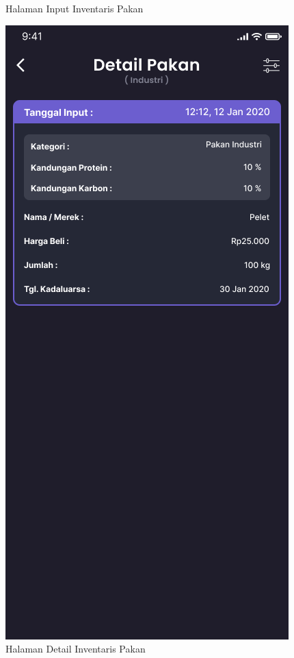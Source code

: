 \begin{enumerate}
\begin{enumerate}
\begin{figure}[H]
			  \caption{Halaman Input Inventaris Pakan}
			\endminipage\hfill
			  \includegraphics[width=\linewidth]{gambar/sprint1/mockup_list_feed.png}
			  \caption{Halaman Detail Inventaris Pakan}
			\endminipage
		\end{figure}


\end{enumerate}
\end{enumerate}
